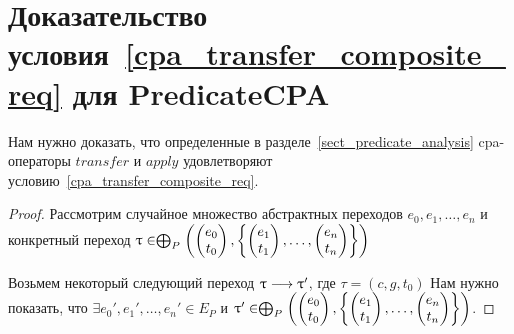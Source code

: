\section{Доказательство условия~\ref{cpa_transfer_composite_req} для PredicateCPA}
\label{sect_transfer_predicate_proof}

Нам нужно доказать, что определенные в разделе~\ref{sect_predicate_analysis} cpa-операторы $transfer$ и $apply$ удовлетворяют условию~\ref{cpa_transfer_composite_req}.

\begin{proof}

Рассмотрим случайное множество абстрактных переходов $e_0, e_1, \dots, e_n$ и конкретный переход $
\uptau \in \mathrel{\bigoplus}_P
\left(
\begin{pmatrix}
e_0 \\
t_0 
\end{pmatrix},
\left\{
\begin{pmatrix}
e_1 \\
t_1 
\end{pmatrix},
\dots ,
\begin{pmatrix}
e_n \\
t_n 
\end{pmatrix}
\right\}
\right)$

Возьмем некоторый следующий переход $\uptau \longrightarrow \uptau'$, где $\tau = (c, g, t_0)$
Нам нужно показать, что 
$\exists e_0', e_1', \dots, e_n' \in E_P$ и  $
\uptau' \in \mathrel{\bigoplus}_P
\left(
\begin{pmatrix}
e_0 \\
t_0 
\end{pmatrix},
\left\{
\begin{pmatrix}
e_1 \\
t_1 
\end{pmatrix},
\dots ,
\begin{pmatrix}
e_n \\
t_n 
\end{pmatrix}
\right\}
\right)$.


\end{proof}
